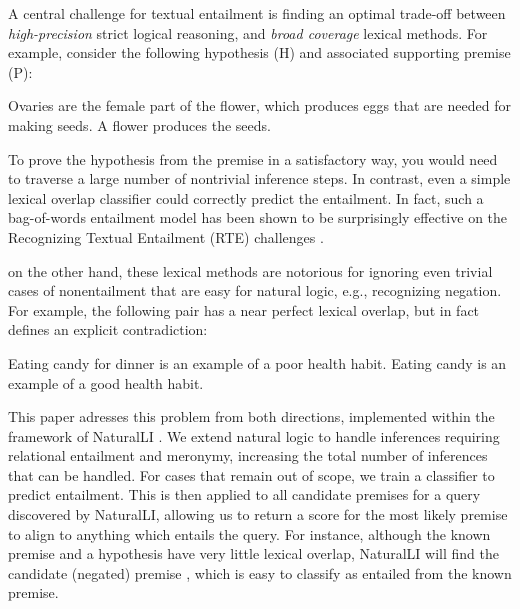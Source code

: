 A central challenge for textual entailment is finding an optimal trade-off between
  \textit{high-precision} strict logical reasoning, and \textit{broad coverage}
  lexical methods.
For example, consider the following hypothesis (H) and associated supporting premise (P):

\entailmentExample
{Ovaries are the female part of the flower, which produces eggs that are needed for making seeds.}
{A flower produces the seeds.}

To prove the hypothesis from the premise in a satisfactory way, you would need
  to traverse a large number of nontrivial inference steps.
In contrast, even a simple lexical overlap classifier could correctly predict
  the entailment.
In fact, such a bag-of-words entailment model has been shown to be surprisingly
  effective on the Recognizing Textual Entailment (RTE) challenges 
  \cite{key:2009maccartney-thesis}.

on the other hand, these lexical methods are notorious for ignoring even trivial 
  cases of nonentailment that are easy for natural logic, e.g., recognizing negation.
For example, the following pair has a near perfect lexical overlap, but in fact defines
  an explicit contradiction:

\entailmentExample
{Eating candy for dinner is an example of a poor health habit.}
{Eating candy is an example of a good health habit.}


This paper adresses this problem from both directions, implemented within the
  framework of NaturalLI \cite{key:2014angeli-naturalli}.
We extend natural logic to handle inferences requiring relational entailment 
  and meronymy, increasing the total number of inferences that can be handled.
For cases that remain out of scope, we train a classifier to predict 
  entailment.
This is then applied to all candidate premises for a query discovered by 
  NaturalLI, allowing us to return a score for the most likely premise to
  align to anything which entails the query.
For instance, although the known premise  
  and a hypothesis  
  have very little lexical overlap, NaturalLI
  will find the candidate (negated) premise ,
  which is easy to classify as entailed from the known premise.
  
